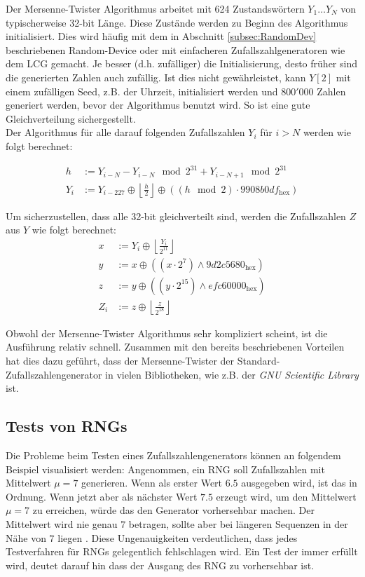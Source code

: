 \documentclass{book}
\begin{document}
\begin{refsection}
Der Mersenne-Twister Algorithmus arbeitet mit 624 Zustandswörtern $Y_1 \dots Y_N$ von typischerweise 32-bit Länge. Diese Zustände werden zu Beginn des Algorithmus initialisiert. Dies wird häufig mit dem in Abschnitt \ref{subsec:RandomDev} beschriebenen Random-Device oder mit einfacheren Zufallszahlgeneratoren wie dem LCG gemacht. Je besser (d.h. zufälliger) die Initialisierung, desto früher sind die generierten Zahlen auch zufällig. Ist dies nicht gewährleistet, kann $Y[2]$ mit einem zufälligen Seed, z.B. der Uhrzeit, initialisiert werden und $800'000$ Zahlen generiert werden, bevor der Algorithmus benutzt wird. So ist eine gute Gleichverteilung sichergestellt. \\

Der Algorithmus für alle darauf folgenden Zufallszahlen $Y_i$ für $i>N$ werden wie folgt berechnet:

\begin{align}
	h &:=  Y_{i-N} - Y_{i-N} \mod{2^{31}} + Y_{i-N+1} \mod{2^{31}} \\
	Y_i &:= Y_{i-227} \oplus \left\lfloor \frac{h}{2} \right\rfloor \oplus \left( \left(h \mod{2} \right) \cdot 9908b0df_{\text{hex}}\right)
\end{align}

Um sicherzustellen, dass alle 32-bit gleichverteilt sind, werden die Zufallszahlen $Z$ aus $Y$ wie folgt berechnet: 
\begin{align}
	x &:= Y_{i} \oplus \left\lfloor \frac{Y_i}{2^{11}} \right\rfloor \\
	y &:= x \oplus \left(\left(x \cdot 2^7\right) \wedge 9d2c5680_{\text{hex}} \right) \\
	z &:= y \oplus \left(\left(y \cdot 2^{15}\right) \wedge efc60000_{\text{hex}} \right) \\
	Z_i &:= z \oplus \left\lfloor \frac{z}{2^{18}} \right\rfloor
\end{align}

Obwohl der Mersenne-Twister Algorithmus sehr kompliziert scheint, ist die Ausführung relativ schnell. Zusammen mit den bereits beschriebenen Vorteilen hat dies dazu geführt, dass der Mersenne-Twister der Standard-Zufallszahlengenerator in vielen Bibliotheken, wie z.B. der \textit{GNU Scientific Library} ist.

\newpage
\subsection{Tests von RNGs}
Die Probleme beim Testen eines Zufallszahlengenerators können an folgendem Beispiel visualisiert werden: Angenommen, ein RNG soll Zufallszahlen mit Mittelwert $\mu = 7$ generieren. Wenn als erster Wert $6.5$ ausgegeben wird, ist das in Ordnung. Wenn jetzt aber als nächster Wert $7.5$ erzeugt wird, um den Mittelwert $\mu = 7$ zu erreichen, würde das den Generator vorhersehbar machen. Der Mittelwert wird nie genau $7$ betragen, sollte aber bei längeren Sequenzen in der Nähe von $7$ liegen \cite{rng:BeautifulTesting}. Diese Ungenauigkeiten verdeutlichen, dass jedes Testverfahren für RNGs gelegentlich fehlschlagen wird. Ein Test der immer erfüllt wird, deutet darauf hin dass der Ausgang des RNG zu vorhersehbar ist. \\



\end{refsection}
\end{document}
